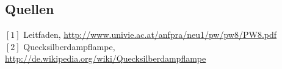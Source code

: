 \documentclass[12pt,a4paper]{article}
\begin{document}
\begin{multicols}{2}
\section{Quellen}
$[1]$ Leitfaden, \url{http://www.univie.ac.at/anfpra/neu1/pw/pw8/PW8.pdf}\\
$[2]$ Quecksilberdampflampe, \url{http://de.wikipedia.org/wiki/Quecksilberdampflampe}\\

\end{multicols}
\end{document}

